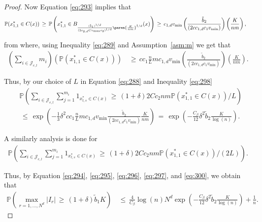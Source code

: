 \documentclass[twoside,11pt]{article}
\begin{document}
\begin{proof}
Now Equation \eqref{eq:293} implies that
\begin{align}
    \mathbb{P}(x_{1,1}^* \in C(x)) 
    &\,\geq\, \mathbb{P}\left(x_{1,1}^* \in B_{\frac{(\tilde b_1)^{1/d}}{(2c_{2,d} Cv_{\text{max}}c_2)^{1/d}}\paren{\frac{K}{nm}}^{1/d}}(x) \right) \,\geq\, c_{1,d} v_{\text{min}} \left(\frac{\tilde{b}_2}{(2cc_{1,d}c_1v_{\text{min}})}\right) \left(\frac{K}{nm}\right), \label{eq:300}
\end{align}

from where, using Inequality \eqref{eq:289} and Assumption~\ref{asm:m} we get that
\begin{align}
    \left(\sum_{i \in \mathcal{J}_{e,l}} m_i\right) \left(\mathbb{P}(x_{1,1}^* \in C(x)) \right) 
    &\,\geq\, cc_1\frac{n}{L}mc_{1,d} v_{\text{min}} \left(\frac{\tilde{b}_2}{(2cc_{1,d}c_1v_{\text{min}})}\right) \left(\frac{K}{nm}\right). \label{eq:301}
\end{align}

Thus, by our choice of \(L\) in Equation \eqref{eq:288} and Inequality \eqref{eq:298}
\begin{align}
   & \mathbb{P}\left(\sum_{i \in \mathcal{J}_{e,l}} \sum_{j=1}^{m_i} 1_{x_{t,s}^*\in C(x)} \,\geq\, (1+\delta)2Cc_2nm\mathbb{P}(x_{1,1}^* \in C(x)) / L \right) \\
    &\,\leq\, \exp\left(-\frac{1}{3} \delta^2 cc_1\frac{n}{L}mc_{1,d} v_{\text{min}} \frac{\tilde{b}_2}{(2cc_{1,d}c_1v_{\text{min}})} \frac{K}{nm} \right) \,=\, \exp\left(-\frac{C_{\beta}}{12} \delta^2 \tilde b_2 \frac{K}{\log(n)} \right). \label{eq:301}
\end{align}

A similarly analysis is done for
\begin{align}
    \mathbb{P}\left(\sum_{i \in \mathcal{J}_{e,l}} \sum_{j=1}^{m_i} 1_{x_{t,s}^*\in C(x)} \,\geq\, (1+\delta)2Cc_2nm\mathbb{P}(x_{1,1}^* \in C(x)) / (2L) \right). 
\end{align}

Thus, by Equation \eqref{eq:294}, \eqref{eq:295}, \eqref{eq:296}, \eqref{eq:297}, and \eqref{eq:300}, we obtain that
\begin{align}
    \mathbb{P}\left(\max_{r=1,\ldots,N^d} |I_r| \,\geq\, (1+\delta)\tilde b_1 K \right) 
    &\,\leq\, \frac{4}{C_{\beta}} \log(n)N^d \exp\left(-\frac{C_{\beta}}{12} \delta^2 \tilde b_2 \frac{K}{\log(n)} \right) + \frac{1}{n}. \label{eq:304}
\end{align}



\end{proof}
\end{document}
